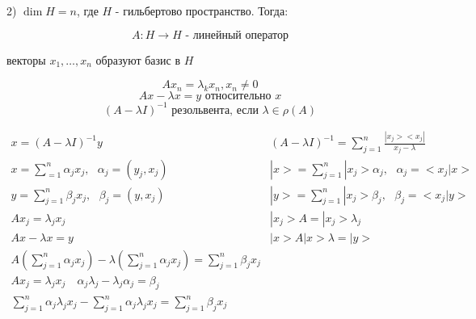 \documentclass[12pt, a4paper]{report}
\begin{document}
2) \( \dim H = n \), где \( H \) - гильбертово пространство. Тогда: 

\[ A : H \to  H \text{ - линейный оператор}  \] 

векторы \( x_1, \ldots, x_n \) образуют базис в \( H  \) 

\[ A x_n = \lambda_k x_n ,x_n \neq 0 \] 
\[ Ax - \lambda x = y \text{ относительно } x  \] 
\[ (A - \lambda I )^{-1} \text{  резольвента, если } \lambda \in \rho (A)   \] 

\[ \begin{array}{l|l}
x = (A - \lambda I )^{-1 }  y & \displaystyle  (A - \lambda I )^{-1 }  = \sum_{j =1} ^n \frac{ |x_j > < x_j |}{x_j - \lambda}  \\ 
\displaystyle   x= \sum_{=1} ^n \alpha_j x_j , \text{ }  \alpha_j = (y_j, x_j)& \displaystyle  |x >  = \sum_{j =1}^{n } |x_j > \alpha_j , \text{ }  \alpha_j = <x_j |x > \\
\displaystyle  y= \sum_{j =1}^n \beta_j x_j , \text{ }  \beta_j = (y , x_j ) & \displaystyle | y > = \sum_{j =1}^ n |x_j > \beta_j , \text{ }  \beta_j = <x_j | y> \\
A x_j = \lambda_j x_j & |x_j > A = |x_j > \lambda_j \\
Ax  - \lambda x = y & | x > A | x> \lambda = |y > \\
\displaystyle  A \left( \sum_{j =1}^n \alpha_j x_j  \right) - \lambda \left( \sum_{j =1}^n \alpha_j x_j \right) = \sum_{j =1}^n \beta_j x_j & \\ 
A x_j = \lambda_j x_j \quad  \alpha_j \lambda_j - \lambda_j \alpha_j = \beta_j &\\
\displaystyle  \sum_{j =1} ^n \alpha_j \lambda_j x_j - \sum_{j=1} ^n \alpha_j \lambda_j x_j = \sum_{j=1}^n \beta_j x_j &
\end{array} \] 

\ifdefined\mainfile
\else
    
\end{document}
